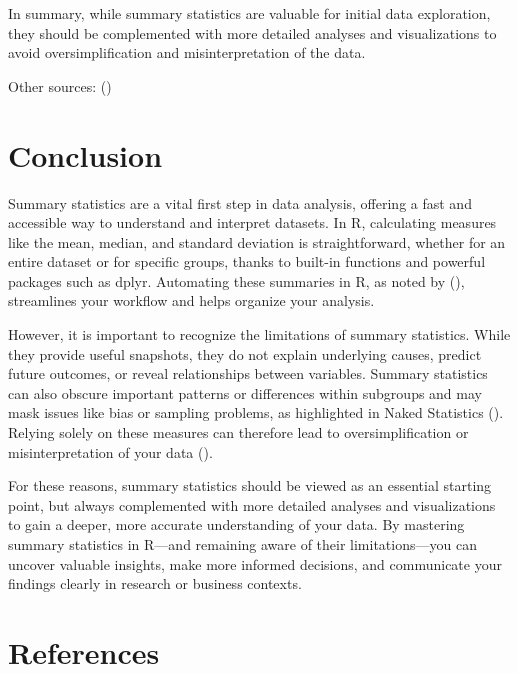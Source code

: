 \documentclass[
  man,
  floatsintext,
  longtable,
  nolmodern,
  notxfonts,
  notimes,
  colorlinks=true,linkcolor=blue,citecolor=blue,urlcolor=blue]{apa7}
\begin{document}
In summary, while summary statistics are valuable for initial data
exploration, they should be complemented with more detailed analyses and
visualizations to avoid oversimplification and misinterpretation of the
data.

Other sources: ()

\section{Conclusion}\label{conclusion}

Summary statistics are a vital first step in data analysis, offering a
fast and accessible way to understand and interpret datasets. In R,
calculating measures like the mean, median, and standard deviation is
straightforward, whether for an entire dataset or for specific groups,
thanks to built-in functions and powerful packages such as dplyr.
Automating these summaries in R, as noted by
(), streamlines your
workflow and helps organize your analysis.

However, it is important to recognize the limitations of summary
statistics. While they provide useful snapshots, they do not explain
underlying causes, predict future outcomes, or reveal relationships
between variables. Summary statistics can also obscure important
patterns or differences within subgroups and may mask issues like bias
or sampling problems, as highlighted in Naked Statistics
(). Relying solely on
these measures can therefore lead to oversimplification or
misinterpretation of your data
().

For these reasons, summary statistics should be viewed as an essential
starting point, but always complemented with more detailed analyses and
visualizations to gain a deeper, more accurate understanding of your
data. By mastering summary statistics in R---and remaining aware of
their limitations---you can uncover valuable insights, make more
informed decisions, and communicate your findings clearly in research or
business contexts.

\newpage

\section{References}\label{references}
\end{document}
